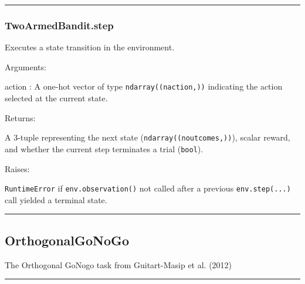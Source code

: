\begin{center}\rule{0.5\linewidth}{\linethickness}\end{center}

\subsubsection{TwoArmedBandit.step}\label{twoarmedbandit.step}

\begin{Shaded}
\begin{Highlighting}[]
\end{Highlighting}
\end{Shaded}

Executes a state transition in the environment.

Arguments:

action : A one-hot vector of type \texttt{ndarray((naction,))}
indicating the action selected at the current state.

Returns:

A 3-tuple representing the next state (\texttt{ndarray((noutcomes,))}),
scalar reward, and whether the current step terminates a trial
(\texttt{bool}).

Raises:

\texttt{RuntimeError} if \texttt{env.observation()} not called after a
previous \texttt{env.step(...)} call yielded a terminal state.

\begin{center}\rule{0.5\linewidth}{\linethickness}\end{center}

\subsection{OrthogonalGoNoGo}\label{orthogonalgonogo}

\begin{Shaded}
\begin{Highlighting}[]
\end{Highlighting}
\end{Shaded}

The Orthogonal GoNogo task from Guitart-Masip et al. (2012)

\begin{center}\rule{0.5\linewidth}{\linethickness}\end{center}

